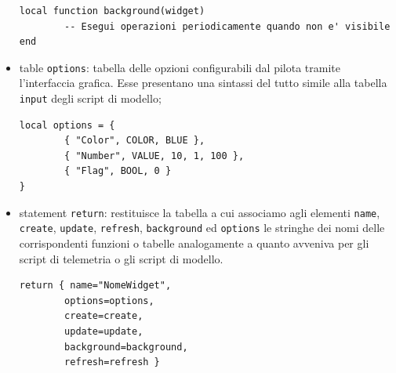 \documentclass[a4paper, 12pt]{report} %
\begin{document}
\begin{itemize}
\begin{lstlisting}
local function background(widget)
        -- Esegui operazioni periodicamente quando non e' visibile
end
\end{lstlisting}
        \item table \texttt{options}: tabella delle opzioni configurabili dal pilota tramite l'interfaccia grafica. Esse presentano una sintassi del tutto simile alla tabella \texttt{input} degli script di modello;
\begin{lstlisting}
local options = {
        { "Color", COLOR, BLUE }, 
        { "Number", VALUE, 10, 1, 100 },
        { "Flag", BOOL, 0 } 
}
\end{lstlisting}
        \item statement \texttt{return}: restituisce la tabella a cui associamo agli elementi \texttt{name}, \texttt{create},  \texttt{update}, \texttt{refresh}, \texttt{background} ed \texttt{options} le stringhe dei nomi delle corrispondenti funzioni o tabelle analogamente a quanto avveniva per gli script di telemetria o gli script di modello.
\begin{lstlisting}
return { name="NomeWidget",
        options=options,
        create=create,
        update=update,
        background=background,
        refresh=refresh }
\end{lstlisting}
\end{itemize}
\end{document}
